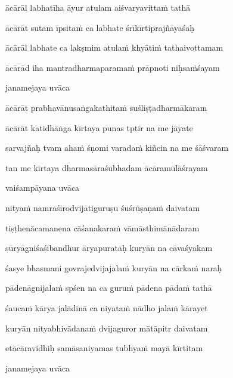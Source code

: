 \ujvers\nemsloka 
ācārāl labhatīha āyur atulam aiśvaryavitta\.m tathā
\dontdisplaylinenum

\nemslokab 
ācārāt sutam īpsita\.m ca labhate śrīkīrtiprajñāyaśaḥ \danda\dontdisplaylinenum

\nemslokac 
ācārāl labhate ca lakṣmim atula\.m khyāti\.m tathaivottamam
\dontdisplaylinenum

\nemslokad 
ācārād iha mantradharmaparama\.m prāpnoti niḥsa\.mśayam \veg\dontdisplaylinenum

\vers

janamejaya uvāca~{\dandab}\dontdisplaylinenum 

\nemsloka 
ācārāt prabhavānusaṅgakathita\.m suśliṣṭadharmākaram
\dontdisplaylinenum

\nemslokab 
ācārāt katidhāṅga kīrtaya punas tptir na me jāyate \danda\dontdisplaylinenum

\nemslokac 
sarvajñaḥ tvam aha\.m śṇomi varada\.m kiñcin na me śāśvaram
\dontdisplaylinenum

\nemslokad 
tan me kīrtaya dharmasāraśubhadam ācāramūlāśrayam \veg\dontdisplaylinenum

\vers

vaiśampāyana uvāca~{\dandab}\dontdisplaylinenum 

\nemsloka 
nitya\.m namraśirodvijātiguruṣu śuśrūṣaṇa\.m daivatam
\dontdisplaylinenum

\nemslokab 
tiṣṭhenācamanena cāśanakara\.m vāmāsthimānādaram \danda\dontdisplaylinenum

\nemslokac 
sūryāgniśaśibandhur āryapurataḥ kuryān na cāvaśyakam
\dontdisplaylinenum

\nemslokad 
śasye bhasmani govrajedvijajala\.m kuryān na cārka\.m naraḥ \veg\dontdisplaylinenum

\ujvers\nemsloka 
pādenāgnijala\.m spśen na ca guru\.m pādena pāda\.m tathā
\dontdisplaylinenum

\nemslokab 
śauca\.m kārya jalādinā ca niyata\.m nādho jala\.m kārayet \danda\dontdisplaylinenum

\nemslokac 
kuryān nityabhivādana\.m dvijaguror mātāpitr daivatam
\dontdisplaylinenum

\nemslokad 
etācāravidhiḥ samāsaniyamas tubhya\.m mayā kīrtitam \veg\dontdisplaylinenum


\vers

janamejaya uvāca~{\dandab}\dontdisplaylinenum 

